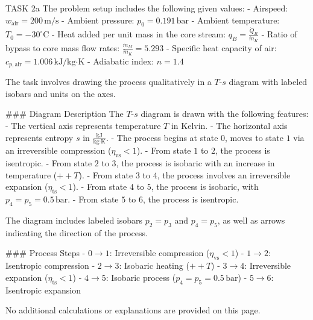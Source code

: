 TASK 2a  
The problem setup includes the following given values:  
- Airspeed: \( w_{\text{air}} = 200 \, \text{m/s} \)  
- Ambient pressure: \( p_0 = 0.191 \, \text{bar} \)  
- Ambient temperature: \( T_0 = -30^\circ\text{C} \)  
- Heat added per unit mass in the core stream: \( q_B = \frac{\dot{Q}_B}{\dot{m}_K} \)  
- Ratio of bypass to core mass flow rates: \( \frac{\dot{m}_M}{\dot{m}_K} = 5.293 \)  
- Specific heat capacity of air: \( c_{p,\text{air}} = 1.006 \, \text{kJ/kg·K} \)  
- Adiabatic index: \( n = 1.4 \)  

The task involves drawing the process qualitatively in a \( T \)-\( s \) diagram with labeled isobars and units on the axes.  

### Diagram Description  
The \( T \)-\( s \) diagram is drawn with the following features:  
- The vertical axis represents temperature \( T \) in Kelvin.  
- The horizontal axis represents entropy \( s \) in \( \frac{\text{kJ}}{\text{kg·K}} \).  
- The process begins at state \( 0 \), moves to state \( 1 \) via an irreversible compression (\( \eta_{\text{vs}} < 1 \)).  
- From state \( 1 \) to \( 2 \), the process is isentropic.  
- From state \( 2 \) to \( 3 \), the process is isobaric with an increase in temperature (\( ++T \)).  
- From state \( 3 \) to \( 4 \), the process involves an irreversible expansion (\( \eta_{\text{ts}} < 1 \)).  
- From state \( 4 \) to \( 5 \), the process is isobaric, with \( p_4 = p_5 = 0.5 \, \text{bar} \).  
- From state \( 5 \) to \( 6 \), the process is isentropic.  

The diagram includes labeled isobars \( p_2 = p_3 \) and \( p_4 = p_5 \), as well as arrows indicating the direction of the process.  

### Process Steps  
- \( 0 \to 1 \): Irreversible compression (\( \eta_{\text{vs}} < 1 \))  
- \( 1 \to 2 \): Isentropic compression  
- \( 2 \to 3 \): Isobaric heating (\( ++T \))  
- \( 3 \to 4 \): Irreversible expansion (\( \eta_{\text{ts}} < 1 \))  
- \( 4 \to 5 \): Isobaric process (\( p_4 = p_5 = 0.5 \, \text{bar} \))  
- \( 5 \to 6 \): Isentropic expansion  

No additional calculations or explanations are provided on this page.